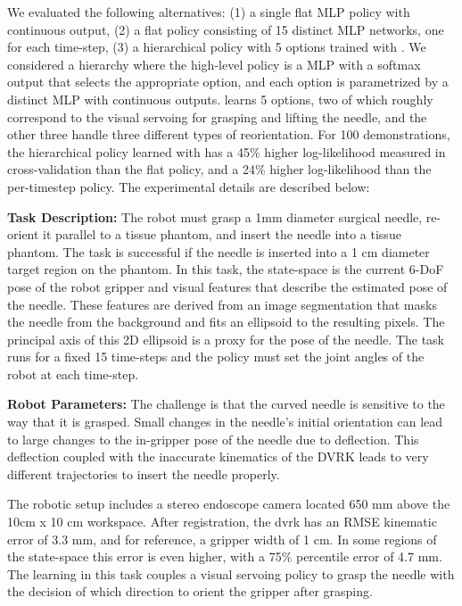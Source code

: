  We evaluated the following alternatives: (1) a single flat MLP policy with continuous output, (2) a flat policy consisting of 15 distinct MLP networks, one for each time-step, (3) a hierarchical policy with 5 options trained with \alg. We considered a hierarchy where the high-level policy is a MLP with a softmax output that selects the appropriate option, and each option is parametrized by a distinct MLP with continuous outputs.
 \alg learns 5 options, two of which roughly correspond to the visual servoing for grasping and lifting the needle, and the other three handle three different types of reorientation.
 For 100 demonstrations, the hierarchical policy learned with \alg has a 45\%  higher log-likelihood measured in cross-validation than the flat policy, and a 24\% higher log-likelihood than the per-timestep policy. 
 The experimental details are described below:
 
\vspace{0.5em} \noindent \textbf{Task Description: } The robot must grasp a 1mm diameter surgical needle, re-orient it parallel to a tissue phantom, and insert the needle into a tissue phantom.
The task is successful if the needle is inserted into a 1 cm diameter target region on the phantom.
In this task, the state-space is the current 6-DoF pose of the robot gripper and visual features that describe the estimated pose of the needle.
These features are derived from an image segmentation that masks the needle from the background and fits an ellipsoid to the resulting pixels. 
The principal axis of this 2D ellipsoid is a proxy for the pose of the needle.
The task runs for a fixed 15 time-steps and the policy must set the joint angles of the robot at each time-step.

\vspace{0.5em} \noindent \textbf{Robot Parameters: } The challenge is that the curved needle is sensitive to the way that it is grasped. Small changes in the needle's initial orientation can lead to large changes to the in-gripper pose of the needle due to deflection.
This deflection coupled with the inaccurate kinematics of the DVRK leads to very different trajectories to insert the needle properly.

The robotic setup includes a stereo endoscope camera located 650 mm above the 10cm x 10 cm workspace.
After registration, the dvrk has an RMSE kinematic error of 3.3 mm, and for reference, a gripper width of 1 cm.
In some regions of the state-space this error is even higher, with a 75\% percentile error of 4.7 mm.
The learning in this task couples a visual servoing policy to grasp the needle with the decision of which direction to orient the gripper after grasping.

